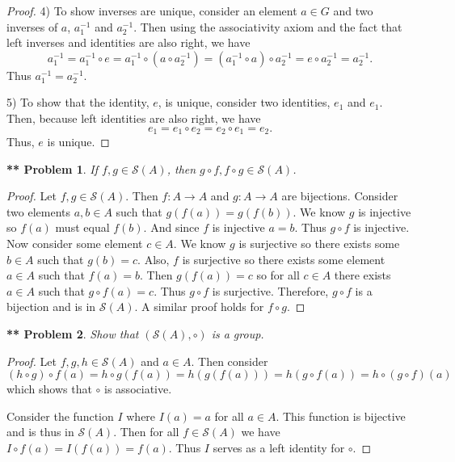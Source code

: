 \documentclass{article}
\newtheorem{**}{** Problem}
\begin{document}
\begin{flushleft}
\begin{proof}
4) To show inverses are unique, consider an element $a \in G$ and two inverses of $a$, $a^{-1}_1$ and $a^{-1}_2$. Then using the associativity axiom and the fact that left inverses and identities are also right, we have
\[
a^{-1}_1 = a^{-1}_1 \circ e = a^{-1}_1 \circ (a \circ a^{-1}_2) = (a^{-1}_1 \circ a) \circ a^{-1}_2 = e \circ a^{-1}_2 = a^{-1}_2.
\]
Thus $a^{-1}_1 = a^{-1}_2$.\newline

5) To show that the identity, $e$, is unique, consider two identities, $e_1$ and $e_1$. Then, because left identities are also right, we have
\[
e_1 = e_1 \circ e_2 = e_2 \circ e_1 = e_2.
\]
Thus, $e$ is unique.
\end{proof}

\begin{**}
If $f, g \in \mathcal{S}(A)$, then $g \circ f, f \circ g \in \mathcal{S}(A)$.
\end{**}
\begin{proof}
Let $f, g \in \mathcal{S}(A)$. Then $f : A \rightarrow A$ and $g : A \rightarrow A$ are bijections. Consider two elements $a,b \in A$ such that $g(f(a)) = g(f(b))$. We know $g$ is injective so $f(a)$ must equal $f(b)$. And since $f$ is injective $a=b$. Thus $g \circ f$ is injective. Now consider some element $c \in A$. We know $g$ is surjective so there exists some $b \in A$ such that $g(b) = c$. Also, $f$ is surjective so there exists some element $a \in A$ such that $f(a) = b$. Then $g(f(a)) = c$ so for all $c \in A$ there exists $a \in A$ such that $g \circ f (a) = c$. Thus $g \circ f$ is surjective. Therefore, $g \circ f$ is a bijection and is in $\mathcal{S}(A)$. A similar proof holds for $f \circ g$.
\end{proof}

\begin{**}
Show that $(\mathcal{S}(A), \circ)$ is a group.
\end{**}
\begin{proof}
Let $f, g, h \in \mathcal{S}(A)$ and $a \in A$. Then consider
\[
(h \circ g) \circ f (a) = h \circ g(f(a)) = h(g(f(a))) = h(g \circ f(a)) = h \circ (g \circ f) (a)
\]
which shows that $\circ$ is associative.\newline

Consider the function $I$ where $I(a) = a$ for all $a \in A$. This function is bijective and is thus in $\mathcal{S}(A)$. Then for all $f \in \mathcal{S}(A)$ we have $I \circ f (a) = I(f(a)) = f(a)$. Thus $I$ serves as a left identity for $\circ$.\newline


\end{proof}
\end{flushleft}
\end{document}
